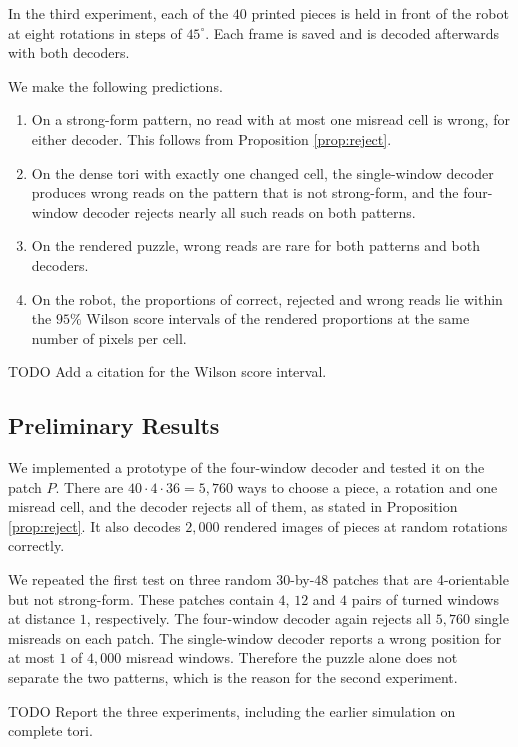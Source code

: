 \documentclass{lipics-v2021}
\newcommand{\todo}[1]{{\color{blue}TODO #1}}
\begin{document}
In the third experiment, each of the $40$ printed pieces is held in front of the robot at eight rotations in steps of $45^\circ$.
Each frame is saved and is decoded afterwards with both decoders.

We make the following predictions.
\begin{enumerate}
\item On a strong-form pattern, no read with at most one misread cell is wrong, for either decoder. This follows from Proposition \ref{prop:reject}.
\item On the dense tori with exactly one changed cell, the single-window decoder produces wrong reads on the pattern that is not strong-form, and the four-window decoder rejects nearly all such reads on both patterns.
\item On the rendered puzzle, wrong reads are rare for both patterns and both decoders.
\item On the robot, the proportions of correct, rejected and wrong reads lie within the $95\%$ Wilson score intervals of the rendered proportions at the same number of pixels per cell.
\end{enumerate}
\todo{Add a  citation for the Wilson score interval.}

\subsection{Preliminary Results}
\label{sec:experiments_preliminary}

We implemented a prototype of the four-window decoder and tested it on the patch $P$.
There are $40 \cdot 4 \cdot 36 = 5{,}760$ ways to choose a piece, a rotation and one misread cell, and the decoder rejects all of them, as stated in Proposition \ref{prop:reject}.
It also decodes $2{,}000$ rendered images of pieces at random rotations correctly.

We repeated the first test on three random $30$-by-$48$ patches that are 4-orientable but not strong-form.
These patches contain $4$, $12$ and $4$ pairs of turned windows at distance $1$, respectively.
The four-window decoder again rejects all $5{,}760$ single misreads on each patch.
The single-window decoder reports a wrong position for at most $1$ of $4{,}000$ misread windows.
Therefore the puzzle alone does not separate the two patterns, which is the reason for the second experiment.

\todo{Report the three experiments, including the earlier simulation on complete tori.}
\end{document}
